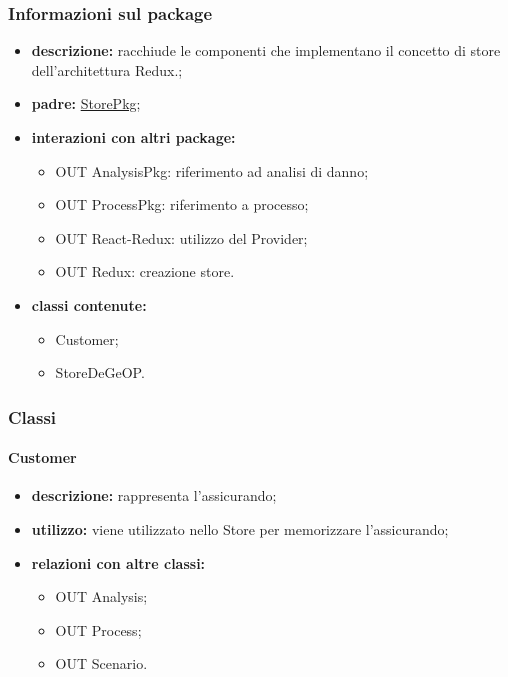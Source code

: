 \subsubsection{Informazioni sul package}
\begin{itemize}
	\item \textbf{descrizione:} racchiude le componenti che implementano il concetto di store dell'architettura Redux.;
	\item \textbf{padre:} \hyperref[pkg::StorePkg]{StorePkg};
	\item \textbf{interazioni con altri package:} 
	\begin{itemize}
		\item OUT AnalysisPkg: riferimento ad analisi di danno;
		\item OUT ProcessPkg: riferimento a processo;
		\item OUT React-Redux: utilizzo del Provider;
		\item OUT Redux: creazione store.
	\end{itemize}
	\item \textbf{classi contenute:}
	\begin{itemize}
		\item Customer;
		\item StoreDeGeOP.
	\end{itemize}
\end{itemize}
\subsubsection{Classi}
\paragraph{Customer}
\begin{itemize}
	\item \textbf{descrizione:} rappresenta l'assicurando;
	\item \textbf{utilizzo:} viene utilizzato nello Store per memorizzare l'assicurando;
	\item \textbf{relazioni con altre classi:} 
	\begin{itemize}
		\item OUT Analysis;
		\item OUT Process;
		\item OUT Scenario.
	\end{itemize}
\end{itemize}
